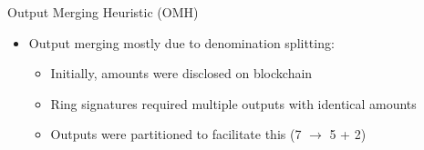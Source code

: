 \begin{frame}{Output Merging Heuristic (OMH)}
	\begin{itemize}
		\item Output merging mostly due to denomination splitting:
		\begin{itemize}
			\item Initially, amounts were disclosed on blockchain
			\item Ring signatures required multiple outputs with identical amounts
			\item Outputs were partitioned to facilitate this (7 $\to$ 5 + 2)
		\end{itemize}
	\end{itemize}
	\end{frame}
	




